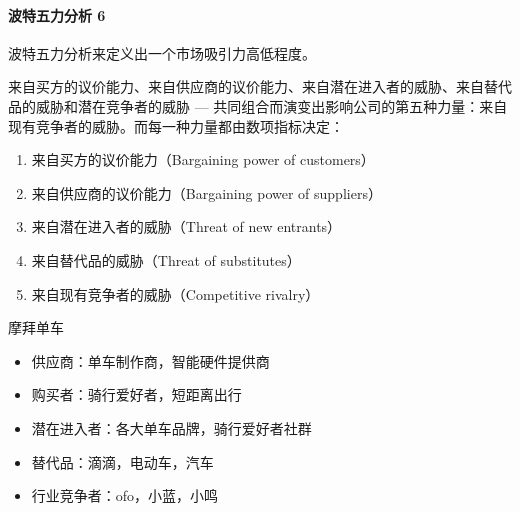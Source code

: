 \documentclass[letterpaper,10pt,english]{sphinxmanual}
\begin{document}
\paragraph{波特五力分析 6\sphinxfootnotemark[494]}
\label{\detokenize{chapter_knowledge/BRD:id16}}%
\begin{footnotetext}[494]\sphinxAtStartFootnote
{}
%
\end{footnotetext}\ignorespaces 
波特五力分析来定义出一个市场吸引力高低程度。

来自买方的议价能力、来自供应商的议价能力、来自潜在进入者的威胁、来自替代品的威胁和潜在竞争者的威胁
—
共同组合而演变出影响公司的第五种力量：来自现有竞争者的威胁。而每一种力量都由数项指标决定：
\begin{enumerate}
%
\item {} 
来自买方的议价能力（Bargaining power of customers）

\item {} 
来自供应商的议价能力（Bargaining power of suppliers）

\item {} 
来自潜在进入者的威胁（Threat of new entrants）

\item {} 
来自替代品的威胁（Threat of substitutes）

\item {} 
来自现有竞争者的威胁（Competitive rivalry）

\end{enumerate}

摩拜单车
\begin{itemize}
\item {} 
供应商：单车制作商，智能硬件提供商

\item {} 
购买者：骑行爱好者，短距离出行

\item {} 
潜在进入者：各大单车品牌，骑行爱好者社群

\item {} 
替代品：滴滴，电动车，汽车

\item {} 
行业竞争者：ofo，小蓝，小鸣%
\begin{footnote}[495]\sphinxAtStartFootnote
{}
%
\end{footnote}

\end{itemize}
\end{document}
